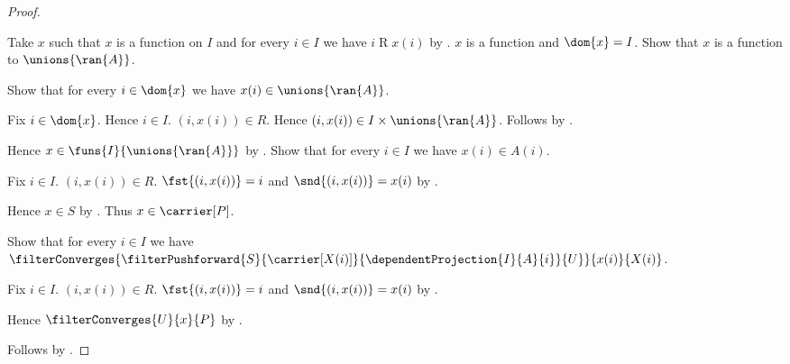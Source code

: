 \begin{proof}
\begin{subproof}
        Take $x$ such that $x$ is a function on $I$ and
            for every $i\in I$ we have $i\mathrel{R}x(i)$ by
            .
        $x$ is a function and $\dom{x}=I$.
        Show that $x$ is a function to $\unions{\ran{A}}$.
        \begin{subproof}
            Show that for every $i\in\dom{x}$ we have
                $x(i)\in\unions{\ran{A}}$.
            \begin{subproof}
                Fix $i\in\dom{x}$.
                Hence $i\in I$.
                $(i,x(i))\in R$.
                Hence $(i,x(i))\in I\times\unions{\ran{A}}$.
                Follows by .
            \end{subproof}
        \end{subproof}
        Hence $x\in\funs{I}{\unions{\ran{A}}}$ by
            .
        Show that for every $i\in I$ we have $x(i)\in A(i)$.
        \begin{subproof}
            Fix $i\in I$.
            $(i,x(i))\in R$.
            $\fst{(i,x(i))}=i$ and $\snd{(i,x(i))}=x(i)$ by
                .
        \end{subproof}
        Hence $x\in S$ by .
        Thus $x\in\carrier[P]$.

        Show that for every $i\in I$ we have
            $\filterConverges{
                \filterPushforward{S}{\carrier[X(i)]}{
                    \dependentProjection{I}{A}{i}}{U}
            }{x(i)}{X(i)}$.
        \begin{subproof}
            Fix $i\in I$.
            $(i,x(i))\in R$.
            $\fst{(i,x(i))}=i$ and $\snd{(i,x(i))}=x(i)$ by
                .
        \end{subproof}
        Hence $\filterConverges{U}{x}{P}$ by
            .
    \end{subproof}
    Follows by .
\end{proof}
